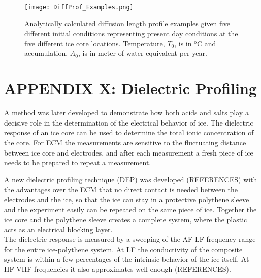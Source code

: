 \documentclass[../../CompleteThesis2/Complete_2ndDraft.tex]{subfiles}
\begin{document}
	\begin{figure}
		\centering
		\texttt{[image: DiffProf\_Examples.png]}
		\caption[Five different modelled diffusion length profiles.]{\small Analytically calculated diffusion length profile examples given five different initial conditions representing present day conditions at the five different ice core locations. Temperature, $T_0$, is in $^{\text{o}}$C and accumulation, $A_0$, is in meter of water equivalent per year.}
		\label{Fig:DiffProf_Examples}
	\end{figure}


	\newpage 

	\newpage
	\section[Appendix X: DEP]{APPENDIX X: Dielectric Profiling}
	\label{AppX:DEP}
	
	A method was later developed to demonstrate how both acids and salts play a decisive role in the determination of the electrical behavior of ice. The dielectric response of an ice core can be used to determine the total ionic concentration of the core. For ECM the measurements are sensitive to the fluctuating distance between ice core and electrodes, and after each measurement a fresh piece of ice needs to be prepared to repeat a measurement.
	
	A new dielectric profiling technique (DEP) was developed (REFERENCES) with the advantages over the ECM that no direct contact is needed between the electrodes and the ice, so that the ice can stay in a protective polythene sleeve and the experiment easily can be repeated on the same piece of ice. Together the ice core and the polythene sleeve creates a complete system, where the plastic acts as an electrical blocking layer.\\
	The dielectric response is measured by a sweeping of the AF-LF frequency range for the entire ice-polythene system. At LF the conductivity of the composite system is within a few percentages of the intrinsic behavior of the ice itself. At HF-VHF frequencies it also approximates well enough (REFERENCES).
	
\end{document}
